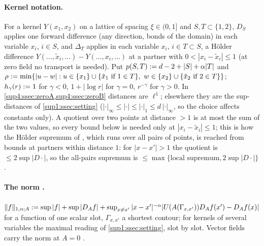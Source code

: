 \paragraph{Kernel notation.} For a kernel $Y(x_1,x_2)$ on a lattice of spacing $\xi\in(0,1]$ and $S,T\subset\{1,2\}$, $D_S$ applies one forward difference (any direction, bonds of the domain) in each variable $x_i$, $i\in S$, and $\Delta_T$ applies in each variable $x_i$, $i\in T\subset S$, a H\"older difference $Y(\dots,\tilde x_i,\dots)-Y(\dots,x_i,\dots)$ at a partner with $0<|x_i-\tilde x_i|\le1$ (at zero field no transport is needed). Put $p(S,T):= d-2+|S|+\alpha|T|$ and $\rho:=\min\{|u-w|:u\in\{x_1\}\cup\{\tilde x_1\text{ if }1\in T\},\ w\in\{x_2\}\cup\{\tilde x_2\text{ if }2\in T\}\}$; $h_\gamma(r):=1$ for $\gamma<0$, $1+|\log r|$ for $\gamma=0$, $r^{-\gamma}$ for $\gamma>0$. In \cref{sup4:ssec:zeroA,sup4:ssec:zeroB} distances are $\ell^1$; elsewhere they are the sup-distances of \cref{sup1:ssec:setting} ($|\cdot|_\infty\le|\cdot|\le|\cdot|_1\le d\,|\cdot|_\infty$, so the choice affects constants only). A quotient over two points at distance $>1$ is at most the sum of the two values, so every bound below is needed only at $|x_i-\tilde x_i|\le1$; this is how the H\"older supremum of \cite[(1.32)]{Ba3}, which runs over all pairs of points, is reached from bounds at partners within distance $1$: for $|x-x'|>1$ the quotient is $\le2\sup|D\cdot|$, so the all-pairs supremum is $\le\max\{\text{local supremum},2\sup|D\cdot|\}$.

\paragraph{The norm \cite[(1.32)]{Ba3}.} $\lVert f\rVert_{1,\alpha;A}:=\sup|f|+\sup|D_Af|+\sup_{x\ne x'}|x-x'|^{-\alpha}|U(A(\Gamma_{x,x'}))D_Af(x')-D_Af(x)|$ for a function of one scalar slot, $\Gamma_{x,x'}$ a shortest contour; for kernels of several variables the maximal reading of \cref{sup1:ssec:setting}, slot by slot. Vector fields carry the norm at $A=0$ \cite[p.~420]{Ba3}.

